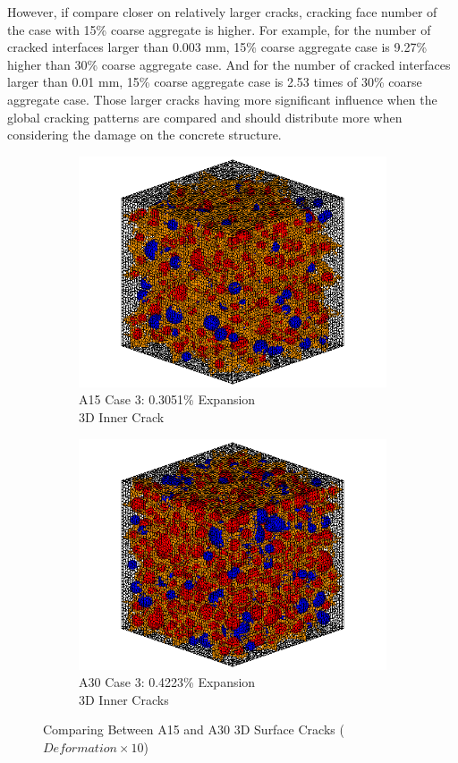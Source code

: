 However, if compare closer on relatively larger cracks, cracking face number of the case with 15\% coarse aggregate is higher. For example, for the number of cracked interfaces larger than 0.003 mm, 15\% coarse aggregate case is 9.27\% higher than 30\% coarse aggregate case. And for the number of cracked interfaces larger than 0.01 mm, 15\% coarse aggregate case is 2.53 times of 30\% coarse aggregate case.  Those larger cracks having more significant influence when the global cracking patterns are compared and should distribute more when considering the damage on the concrete structure.
\begin{figure}[h!]
\centering

    \begin{subfigure}{.5\textwidth}
      \centering
      \includegraphics[width=.8\linewidth]{Files/exp_3D/ASR/A15P75_3_c.png}
    \caption{A15 Case 3: 0.3051\% Expansion \\ 3D Inner Crack}
    \end{subfigure}%
    \begin{subfigure}{.5\textwidth}
      \centering
      \includegraphics[width=.8\linewidth]{Files/exp_3D/ASR/A30P75_3_c.png}
    \caption{A30 Case 3: 0.4223\% Expansion \\ 3D Inner Cracks}
    \end{subfigure}

  \caption{Comparing Between A15 and A30 3D Surface Cracks ($Deformation \times 10$)}
  \label{fig:ASR_A15vsA30P75_3D}
\end{figure}

